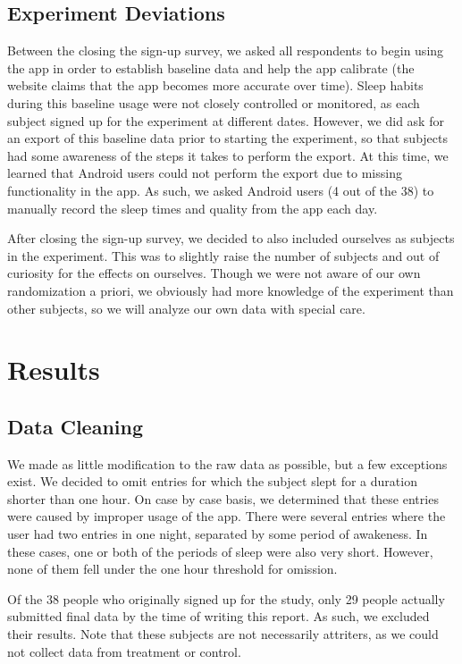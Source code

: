 \documentclass[12pt,]{article}
\begin{document}
\subsection{Experiment Deviations}\label{experiment-deviations}

Between the closing the sign-up survey, we asked all respondents to
begin using the app in order to establish baseline data and help the app
calibrate (the website claims that the app becomes more accurate over
time). Sleep habits during this baseline usage were not closely
controlled or monitored, as each subject signed up for the experiment at
different dates. However, we did ask for an export of this baseline data
prior to starting the experiment, so that subjects had some awareness of
the steps it takes to perform the export. At this time, we learned that
Android users could not perform the export due to missing functionality
in the app. As such, we asked Android users (4 out of the 38) to
manually record the sleep times and quality from the app each day.

After closing the sign-up survey, we decided to also included ourselves
as subjects in the experiment. This was to slightly raise the number of
subjects and out of curiosity for the effects on ourselves. Though we
were not aware of our own randomization a priori, we obviously had more
knowledge of the experiment than other subjects, so we will analyze our
own data with special care.

\section{Results}\label{results}

\subsection{Data Cleaning}\label{data-cleaning}

We made as little modification to the raw data as possible, but a few
exceptions exist. We decided to omit entries for which the subject slept
for a duration shorter than one hour. On case by case basis, we
determined that these entries were caused by improper usage of the app.
There were several entries where the user had two entries in one night,
separated by some period of awakeness. In these cases, one or both of
the periods of sleep were also very short. However, none of them fell
under the one hour threshold for omission.

Of the 38 people who originally signed up for the study, only 29 people
actually submitted final data by the time of writing this report. As
such, we excluded their results. Note that these subjects are not
necessarily attriters, as we could not collect data from treatment or
control.
\end{document}
